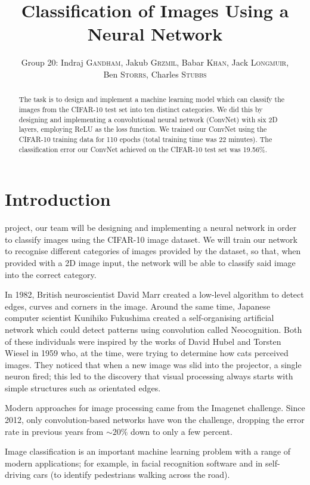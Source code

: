 \documentclass[journal,twoside]{IEEEtran}
\title{Classification of Images Using a Neural Network}
\author{Group 20: Indraj \textsc{Gandham}, Jakub \textsc{Grzmil}, Babar \textsc{Khan}, Jack \textsc{Longmuir},\\ Ben \textsc{Storrs}, Charles \textsc{Stubbs}}
\begin{document}
\maketitle

\begin{abstract}
The task is to design and implement a machine learning model which can classify the images from the CIFAR-10 test set into ten distinct categories. We did this by designing and implementing a convolutional neural network (ConvNet) with six 2D layers, employing ReLU as the loss function. We trained our ConvNet using the CIFAR-10 training data for 110 epochs (total training time was 22 minutes). The classification error our ConvNet achieved on the CIFAR-10 test set was 19.56\%.
\end{abstract}

\section{Introduction}
 project, our team will be designing and implementing a neural network in order to classify images using the CIFAR-10 image dataset. We will train our network to recognise different categories of images provided by the dataset, so that, when provided with a 2D image input, the network will be able to classify said image into the correct category.

In 1982, British neuroscientist David Marr created a low-level algorithm to detect edges, curves and corners in the image. Around  the same time, Japanese computer scientist Kunihiko Fukushima created a self-organising artificial network which could detect patterns using convolution called Neocognition. Both of these individuals were inspired by the works of David Hubel and Torsten Wiesel in 1959 who, at the time, were trying to determine how cats perceived images. They noticed that when a new image was slid into the projector, a single neuron fired; this led to the discovery that visual processing always starts with simple structures such as orientated edges.

Modern approaches for image processing came from the Imagenet challenge. Since 2012, only convolution-based networks have won the challenge, dropping the error rate in previous years from $\sim{}20\%$ down to only a few percent. \cite{demush:vision}

Image classification is an important machine learning problem with a range of modern applications; for example, in facial recognition software and in self-driving cars (to identify pedestrians walking across the road).
\end{document}
